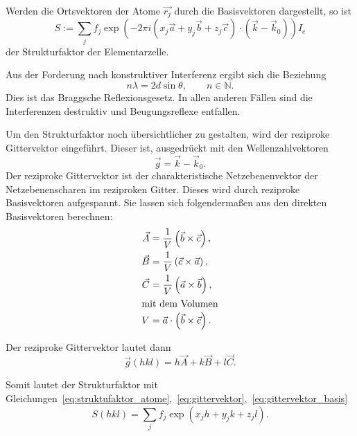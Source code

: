 Werden die Ortsvektoren der Atome $\vec{r_j}$ durch die Basisvektoren dargestellt, so ist
\begin{equation}
  \label{eq:struktufaktor_atome}
  S := \sum_j f_j \exp\left(-2\pi i \left(x_j \vec{a} + y_j \vec{b} + z_j \vec{c}\right) \cdot \left(\vec{k} - \vec{k}_0 \right)\right) I_e
\end{equation}
der Strukturfaktor der Elementarzelle.

Aus der Forderung nach konstruktiver Interferenz ergibt sich die Beziehung
\begin{equation}
  \label{eq:bragg}
  n \lambda = 2 d \sin{\theta}, \hspace{2em} n \in \mathbb{N}.
\end{equation}
Dies ist das Braggsche Reflexionsgesetz.
In allen anderen Fällen sind die Interferenzen destruktiv und Beugungsreflexe entfallen.

Um den Strukturfaktor noch übersichtlicher zu gestalten, wird der reziproke Gittervektor eingeführt.
Dieser ist, ausgedrückt mit den Wellenzahlvektoren
\begin{equation}
  \label{eq:gittervektor}
  \vec{g} = \vec{k} - \vec{k}_0.
\end{equation}
Der reziproke Gittervektor ist der charakteristische Netzebenenvektor der Netzebenenscharen im reziproken Gitter.
Dieses wird durch reziproke Basisvektoren aufgespannt.
Sie lassen sich folgendermaßen aus den direkten Basisvektoren berechnen:
\begin{align}
  \label{eq:reziproke_basisvektoren}
  \vec{A} &= \frac{1}{V} \left(\vec{b} \times \vec{c}\right), \\
  \vec{B} &= \frac{1}{V} \left(\vec{c} \times \vec{a}\right), \\
  \vec{C} &= \frac{1}{V} \left(\vec{a} \times \vec{b}\right), \\
  \intertext{mit dem Volumen}
  V &= \vec{a} \cdot \left(\vec{b} \times \vec{c}\right).
\end{align}

Der reziproke Gittervektor lautet dann
\begin{equation}
  \label{eq:gittervektor_basis}
  \vec{g}(hkl) = h\vec{A} + k\vec{B} + l\vec{C}.
\end{equation}

Somit lautet der Strukturfaktor mit Gleichungen~\eqref{eq:struktufaktor_atome},~\eqref{eq:gittervektor},~\eqref{eq:gittervektor_basis}
\begin{equation}
  S\left(hkl\right) = \sum_j f_j \exp\left(x_j h + y_j k + z_j l\right).
\end{equation}

